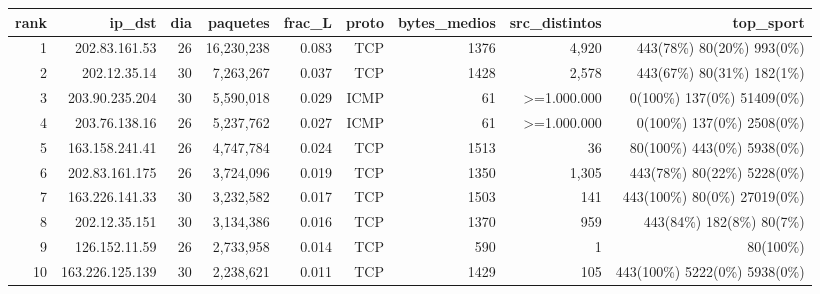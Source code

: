 \begin{tabular}{rrrrrrrrr}
\toprule
rank & ip\_dst & dia & paquetes & frac\_L & proto & bytes\_medios & src\_distintos & top\_sport \\
\midrule
1 & 202.83.161.53 & 26 & 16,230,238 & 0.083 & TCP & 1376 & 4,920 & 443(78\%) 80(20\%) 993(0\%) \\
2 & 202.12.35.14 & 30 & 7,263,267 & 0.037 & TCP & 1428 & 2,578 & 443(67\%) 80(31\%) 182(1\%) \\
3 & 203.90.235.204 & 30 & 5,590,018 & 0.029 & ICMP & 61 & >=1.000.000 & 0(100\%) 137(0\%) 51409(0\%) \\
4 & 203.76.138.16 & 26 & 5,237,762 & 0.027 & ICMP & 61 & >=1.000.000 & 0(100\%) 137(0\%) 2508(0\%) \\
5 & 163.158.241.41 & 26 & 4,747,784 & 0.024 & TCP & 1513 & 36 & 80(100\%) 443(0\%) 5938(0\%) \\
6 & 202.83.161.175 & 26 & 3,724,096 & 0.019 & TCP & 1350 & 1,305 & 443(78\%) 80(22\%) 5228(0\%) \\
7 & 163.226.141.33 & 30 & 3,232,582 & 0.017 & TCP & 1503 & 141 & 443(100\%) 80(0\%) 27019(0\%) \\
8 & 202.12.35.151 & 30 & 3,134,386 & 0.016 & TCP & 1370 & 959 & 443(84\%) 182(8\%) 80(7\%) \\
9 & 126.152.11.59 & 26 & 2,733,958 & 0.014 & TCP & 590 & 1 & 80(100\%) \\
10 & 163.226.125.139 & 30 & 2,238,621 & 0.011 & TCP & 1429 & 105 & 443(100\%) 5222(0\%) 5938(0\%) \\
\bottomrule
\end{tabular}
